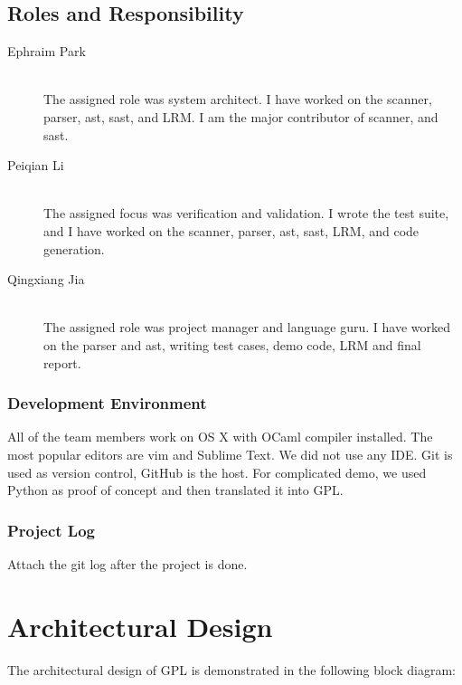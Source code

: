 \documentclass[a4paper,12pt]{article}
\begin{document}
\subsection{Roles and Responsibility}
\begin{description}
	\item[Ephraim Park] \hfill \\
	The assigned role was system architect. I have worked on the scanner, parser, ast, sast, and LRM. I am the major contributor of scanner, and sast.
	\item[Peiqian Li] \hfill \\
	The assigned focus was verification and validation. I wrote the test suite, and I have worked on the scanner, parser, ast, sast, LRM, and code generation.
	\item[Qingxiang Jia] \hfill \\ 
	The assigned role was project manager and language guru. I have worked on the parser and ast, writing test cases, demo code, LRM and final report.
\end{description}

\subsubsection{Development Environment}
All of the team members work on OS X with OCaml compiler installed. The most popular editors are vim and Sublime Text. We did not use any IDE. Git is used as version control, GitHub is the host. For complicated demo, we used Python as proof of concept and then translated it into GPL.

\subsubsection{Project Log}
Attach the git log after the project is done.

\section{Architectural Design}

The architectural design of GPL is demonstrated in the following block diagram:
\end{document}
